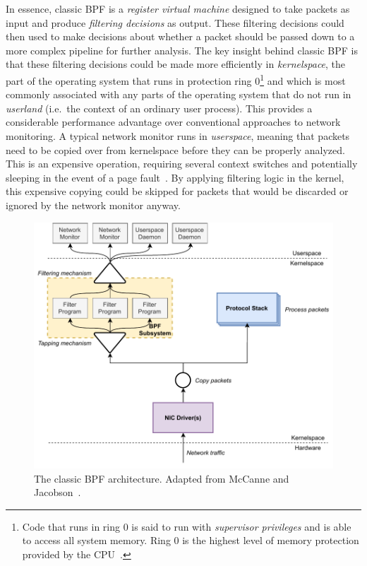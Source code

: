In essence, classic BPF is a \textit{register virtual machine} designed to take packets as
input and produce \textit{filtering decisions} as output. These filtering decisions could
then used to make decisions about whether a packet should be passed down to a more complex
pipeline for further analysis. The key insight behind classic BPF is that these filtering
decisions could be made more efficiently in \textit{kernelspace}, the part of the
operating system that runs in protection ring 0\footnote{Code that runs in ring 0 is said
to run with \textit{supervisor privileges} and is able to access all system memory. Ring
0 is the highest level of memory protection provided by the CPU~\cite{jaeger2008_os_security}.}
and which is most commonly associated with any parts of the operating system that do not
run in \textit{userland} (i.e.~the context of an ordinary user process). This provides
a considerable performance advantage over conventional approaches to network monitoring.
A typical network monitor runs in \textit{userspace}, meaning that packets need to be
copied over from kernelspace before they can be properly analyzed. This is an expensive
operation, requiring several context switches and potentially sleeping in the event of
a page fault~\cite{mccanne1993_bpf}.  By applying filtering logic in the kernel, this
expensive copying could be skipped for packets that would be discarded or ignored by the
network monitor anyway.

\begin{figure}[tbp]
  \centering
  \includegraphics[width=0.8\linewidth]{figs/background/classic-bpf.pdf}
  \caption[The classic BPF architecture]{The classic BPF architecture. Adapted from McCanne and Jacobson~\cite{mccanne1993_bpf}.}%
  \label{fig:classic-bpf}
\end{figure}

